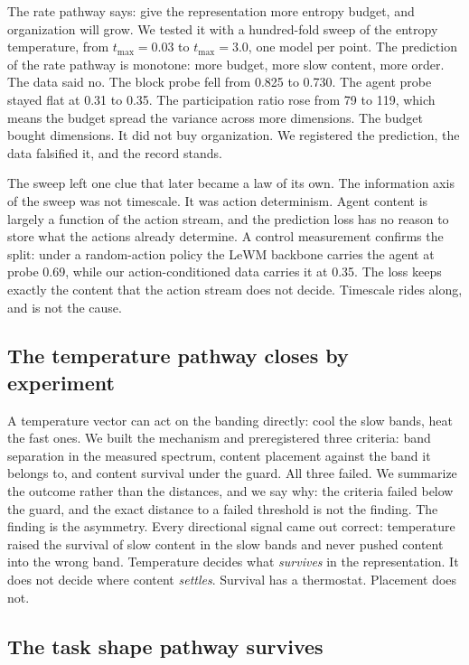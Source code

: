 \documentclass[11pt]{article}
\begin{document}
The rate pathway says: give the representation more entropy budget, and organization will grow.
We tested it with a hundred-fold sweep of the entropy temperature, from $t_{\max} = 0.03$ to $t_{\max} = 3.0$, one model per point.
The prediction of the rate pathway is monotone: more budget, more slow content, more order.
The data said no.
The block probe fell from 0.825 to 0.730.
The agent probe stayed flat at 0.31 to 0.35.
The participation ratio rose from 79 to 119, which means the budget spread the variance across more dimensions.
The budget bought dimensions.
It did not buy organization.
We registered the prediction, the data falsified it, and the record stands.

The sweep left one clue that later became a law of its own.
The information axis of the sweep was not timescale.
It was action determinism.
Agent content is largely a function of the action stream, and the prediction loss has no reason to store what the actions already determine.
A control measurement confirms the split: under a random-action policy the LeWM backbone carries the agent at probe 0.69, while our action-conditioned data carries it at 0.35.
The loss keeps exactly the content that the action stream does not decide.
Timescale rides along, and is not the cause.

\subsection{The temperature pathway closes by experiment}
\label{sec:temperature}

A temperature vector can act on the banding directly: cool the slow bands, heat the fast ones.
We built the mechanism and preregistered three criteria: band separation in the measured spectrum, content placement against the band it belongs to, and content survival under the guard.
All three failed.
We summarize the outcome rather than the distances, and we say why: the criteria failed below the guard, and the exact distance to a failed threshold is not the finding.
The finding is the asymmetry.
Every directional signal came out correct: temperature raised the survival of slow content in the slow bands and never pushed content into the wrong band.
Temperature decides what \emph{survives} in the representation.
It does not decide where content \emph{settles}.
Survival has a thermostat.
Placement does not.

\subsection{The task shape pathway survives}
\label{sec:taskshape}
\end{document}
